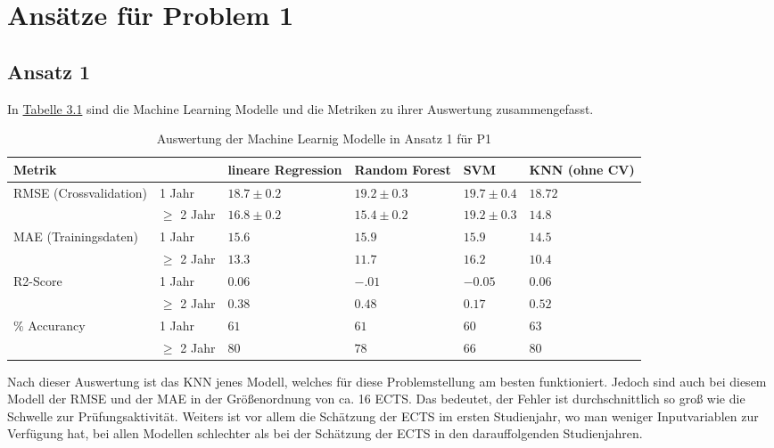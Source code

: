 

\section{Ans\"atze f\"ur Problem 1}


\subsection{Ansatz 1}
In \hyperref[tab:ergebnisA1P1]{Tabelle 3.1} sind die Machine Learning Modelle und die Metriken zu ihrer Auswertung zusammengefasst. 

\begin{table}[ht]
  \caption{\label{tab:ergebnisA1P1} Auswertung der Machine Learnig Modelle in Ansatz 1 f\"ur P1}
  \begin{tabular}{ p{3cm} p{2cm} p{2cm} p{2cm} p{2cm} p{1.5cm} }
    \toprule
    Metrik & & lineare Regression & Random Forest & SVM & KNN (ohne CV) \\
    \midrule
    \multirow{2}{3em}{RMSE (Crossvalidation)} 
    & 1 Jahr & $18.7 \pm 0.2$ & $19.2 \pm 0.3$ & $19.7 \pm 0.4$ & $18.72$  \\
    & $\geq$ 2 Jahr & $16.8 \pm 0.2$& $15.4 \pm 0.2$ & $19.2 \pm 0.3$ & $14.8$   \\
    
    \midrule
    \multirow{2}{3em}{MAE (Trainingsdaten)} 
    & 1 Jahr & $15.6$ & $15.9$ & $15.9$ & $14.5$ \\
    & $\geq$ 2 Jahr & $13.3$ & $11.7$ & $16.2$ & $10.4$ \\
    
    \midrule
    \multirow{2}{3em}{R2-Score} 
    & 1 Jahr & $0.06$ & $-.01$ & $-0.05$ & $0.06$  \\
    & $\geq$ 2 Jahr & $0.38$ & $0.48$  & $0.17$ & $0.52$   \\
   
    \midrule
    \multirow{2}{3em}{$\%$ Accurancy} 
    & 1 Jahr & $61$ & $61$ & $60$ & $63$  \\
    & $\geq$ 2 Jahr & $80$ & $78$ & $66$ & $80$   \\
    
    \bottomrule
    
  \end{tabular}
  
\end{table}

\noindent Nach dieser Auswertung ist das KNN jenes Modell, welches f\"ur diese Problemstellung am besten funktioniert. Jedoch sind auch bei diesem Modell der 
RMSE und der MAE in der Gr\"o{\ss}enordnung von ca. 16 ECTS. Das bedeutet, der Fehler ist durchschnittlich so gro{\ss} wie die Schwelle zur Pr\"ufungsaktivit\"at.
Weiters ist vor allem die Sch\"atzung der ECTS im ersten Studienjahr, wo man weniger Inputvariablen zur Verf\"ugung hat, bei allen Modellen schlechter als bei der 
Sch\"atzung der ECTS in den darauffolgenden Studienjahren. \\

